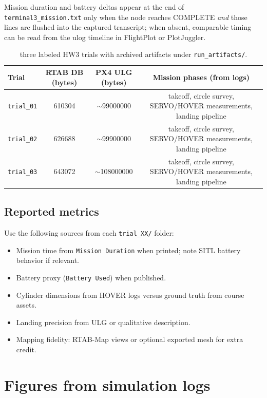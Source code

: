 \documentclass[11pt]{article}
\begin{document}
Mission duration and battery deltas appear at the end of \texttt{terminal3\_mission.txt} only when the node reaches COMPLETE \emph{and} those lines are flushed into the captured transcript; when absent, comparable timing can be read from the ulog timeline in FlightPlot or PlotJuggler.

\begin{table}[H]
\centering
\small
\caption{three labeled HW3 trials with archived artifacts under \texttt{run\_artifacts/}.}
\label{tab:trials}
\begin{tabular}{@{}lccc@{}}
\toprule
Trial & RTAB DB (bytes) & PX4 ULG (bytes) & Mission phases (from logs) \\
\midrule
\texttt{trial\_01} & \num{610304} & $\sim$\num{99000000} & takeoff, circle survey, SERVO/HOVER measurements, landing pipeline \\
\texttt{trial\_02} & \num{626688} & $\sim$\num{99900000} & takeoff, circle survey, SERVO/HOVER measurements, landing pipeline \\
\texttt{trial\_03} & \num{643072} & $\sim$\num{108000000} & takeoff, circle survey, SERVO/HOVER measurements, landing pipeline \\
\bottomrule
\end{tabular}
\end{table}

\subsection{Reported metrics}
Use the following sources from each \texttt{trial\_XX/} folder:
\begin{itemize}[itemsep=2pt]
    \item Mission time from \texttt{Mission Duration} when printed; note SITL battery behavior if relevant.
    \item Battery proxy (\texttt{Battery Used}) when published.
    \item Cylinder dimensions from HOVER logs versus ground truth from course assets.
    \item Landing precision from ULG or qualitative description.
    \item Mapping fidelity: RTAB-Map views or optional exported mesh for extra credit.
\end{itemize}

\newpage
\section{Figures from simulation logs}
\label{sec:figures}
\end{document}
